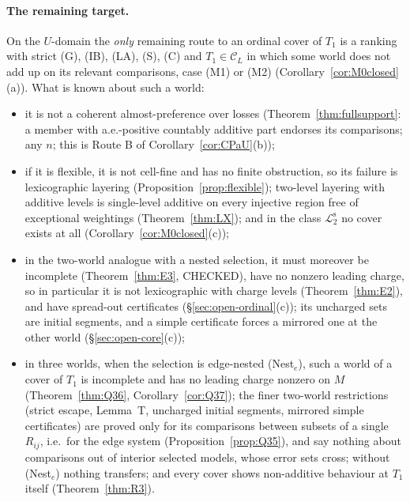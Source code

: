 \documentclass[11pt]{article}
\theoremstyle{definition}
\theoremstyle{remark}
\newcommand{\C}{\mathcal C}
\newcommand{\Ltwo}{\mathcal L_2^{\mathrm s}}
\begin{document}
\paragraph{The remaining target.} On the $U$-domain the \emph{only} remaining route to an ordinal cover of $T_1$ is a ranking with strict (G), (IB), (LA), (S), (C) and $T_1\in\C_L$ in which some world does not add up on its relevant comparisons, case (M1) or (M2) (Corollary~\ref{cor:M0closed}(a)). What is known about such a world:
\begin{itemize}[leftmargin=*]
\item it is not a coherent almost-preference over losses (Theorem~\ref{thm:fullsupport}: a member with a.e.-positive countably additive part endorses its comparisons; any $n$; this is Route B of Corollary~\ref{cor:CPaU}(b));
\item if it is flexible, it is not cell-fine and has no finite obstruction, so its failure is lexicographic layering (Proposition~\ref{prop:flexible}); two-level layering with additive levels is single-level additive on every injective region free of exceptional weightings (Theorem~\ref{thm:LX}); and in the class $\Ltwo$ no cover exists at all (Corollary~\ref{cor:M0closed}(c));
\item in the two-world analogue with a nested selection, it must moreover be incomplete (Theorem~\ref{thm:E3}, CHECKED), have no nonzero leading charge, so in particular it is not lexicographic with charge levels (Theorem~\ref{thm:E2}), and have spread-out certificates (\S\ref{sec:open-ordinal}(c)); its uncharged sets are initial segments, and a simple certificate forces a mirrored one at the other world (\S\ref{sec:open-core}(c));
\item in three worlds, when the selection is edge-nested (Nest$_e$), such a world of a cover of $T_1$ is incomplete and has no leading charge nonzero on $M$ (Theorem~\ref{thm:Q36}, Corollary~\ref{cor:Q37}); the finer two-world restrictions (strict escape, Lemma~T, uncharged initial segments, mirrored simple certificates) are proved only for its comparisons between subsets of a single $R_{ij}$, i.e.\ for the edge system (Proposition~\ref{prop:Q35}), and say nothing about comparisons out of interior selected models, whose error sets cross; without (Nest$_e$) nothing transfers; and every cover shows non-additive behaviour at $T_1$ itself (Theorem~\ref{thm:R3}).
\end{itemize}
\end{document}
